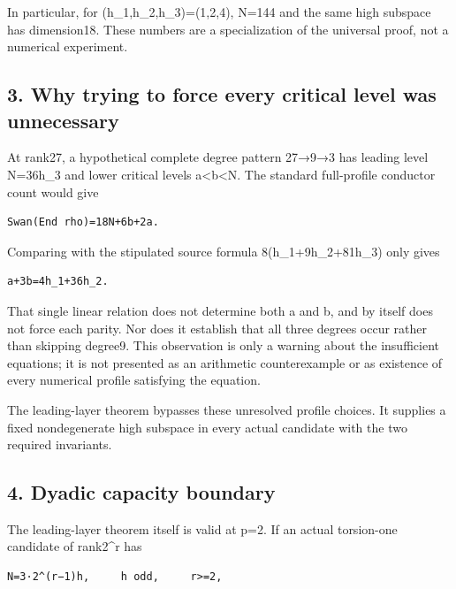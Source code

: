 In particular, for (h\_1,h\_2,h\_3)=(1,2,4), N=144 and the same high
subspace has dimension18. These numbers are a specialization of the
universal proof, not a numerical experiment.

\hypertarget{odd_capacity-why-trying-to-force-every-critical-level-was-unnecessary}{%
\subsection{3. Why trying to force every critical level was
unnecessary}\label{odd_capacity-why-trying-to-force-every-critical-level-was-unnecessary}}

At rank27, a hypothetical complete degree pattern 27→9→3 has leading
level N=36h\_3 and lower critical levels a\textless b\textless N. The
standard full-profile conductor count would give

\begin{Verbatim}[fontsize=\small,breaklines=true,breakanywhere=true]
Swan(End rho)=18N+6b+2a.
\end{Verbatim}

Comparing with the stipulated source formula 8(h\_1+9h\_2+81h\_3) only
gives

\begin{Verbatim}[fontsize=\small,breaklines=true,breakanywhere=true]
a+3b=4h_1+36h_2.
\end{Verbatim}

That single linear relation does not determine both a and b, and by
itself does not force each parity. Nor does it establish that all three
degrees occur rather than skipping degree9. This observation is only a
warning about the insufficient equations; it is not presented as an
arithmetic counterexample or as existence of every numerical profile
satisfying the equation.

The leading-layer theorem bypasses these unresolved profile choices. It
supplies a fixed nondegenerate high subspace in every actual candidate
with the two required invariants.

\hypertarget{odd_capacity-dyadic-capacity-boundary}{%
\subsection{4. Dyadic capacity
boundary}\label{odd_capacity-dyadic-capacity-boundary}}

The leading-layer theorem itself is valid at p=2. If an actual
torsion-one candidate of rank2\^{}r has

\begin{Verbatim}[fontsize=\small,breaklines=true,breakanywhere=true]
N=3·2^(r−1)h,     h odd,     r>=2,
\end{Verbatim}


